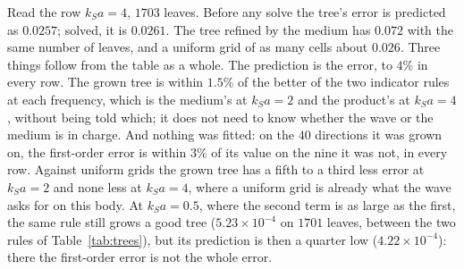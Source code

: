 \documentclass[11pt,a4paper]{article}
\begin{document}
Read the row $k_Sa=4$, $1703$ leaves. Before any solve the tree's error is predicted as $0.0257$; solved,
it is $0.0261$. The tree refined by the medium has $0.072$ with the same number of leaves, and a uniform
grid of as many cells about $0.026$. Three things follow from the table as a whole. The prediction is the
error, to $4\%$ in every row. The grown tree is within $1.5\%$ of the better of the two indicator rules at
each frequency, which is the medium's at $k_Sa=2$ and the product's at $k_Sa=4$, without being told
which; it does not need to know whether the wave or the medium is in charge. And nothing was fitted: on
the $40$ directions it was grown on, the first-order error is within $3\%$ of its value on the nine it
was not, in every row. Against uniform grids the grown tree has a fifth to a third less error at
$k_Sa=2$ and none less at $k_Sa=4$, where a uniform grid is already what the wave asks for on this
body.
At $k_Sa=0.5$, where the second term is as large as the first, the same rule still grows a good tree
($5.23\times10^{-4}$ on $1701$ leaves, between the two rules of Table~\ref{tab:trees}), but its prediction
is then a quarter low ($4.22\times10^{-4}$): there the first-order error is not the whole error.
\end{document}

